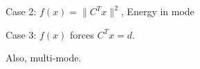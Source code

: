 \documentclass[landscape]{foils}
\renewcommand{\oursection}[1]{
\foilhead[-1.0cm]{#1}
}
\begin{document}
\BIT
\item Case 2: $f(x) = \|C^T x\|^2$, Energy in mode
\item Case 3: $f(x)$ forces $C^T x = d$.
\item Also, multi-mode.
\EIT

\end{document}
